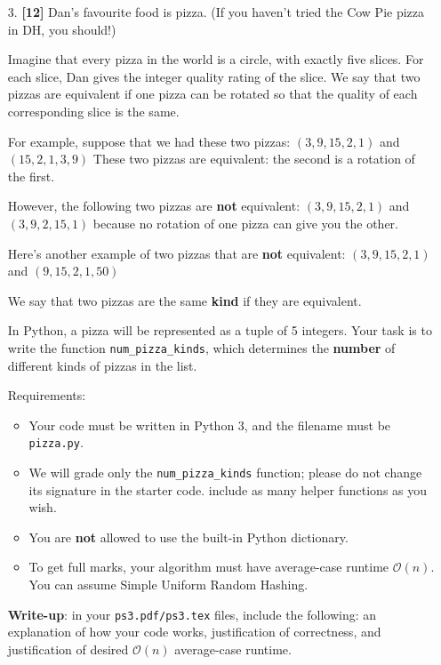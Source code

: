 \documentclass{assignment-263}
\begin{document}
\program

\begin{enumerate}
	\item[3.] \textbf{[12]} Dan's favourite food is pizza. (If you haven't
		tried the Cow Pie pizza in DH, you should!)

		Imagine that every pizza in the world is a circle, with exactly five slices.
		For each slice, Dan gives the integer quality rating of the slice. We say
		that two pizzas are equivalent if one pizza can be rotated so that the
		quality of each corresponding slice is the same.

		For example, suppose that we had these two pizzas:
		$(3, 9, 15, 2, 1)$
		and
		$(15, 2, 1, 3, 9)$
		These two pizzas are equivalent: the second is a rotation of the first.

		However, the following two pizzas are {\bf not} equivalent:
		$(3, 9, 15, 2, 1)$
		and
		$(3, 9, 2, 15, 1)$
		because no rotation of one pizza can give you the other.

		Here's another example of two pizzas that are {\bf not} equivalent:
		$(3, 9, 15, 2, 1)$
		and
		$(9, 15, 2, 1, 50)$

		We say that two pizzas are the same {\bf kind} if they are equivalent.

		In Python, a pizza will be represented as a tuple of 5 integers.
		Your task is to write the function \verb|num_pizza_kinds|, which
		determines the \textbf{number} of different kinds of pizzas in the
		list.


Requirements:
\begin{itemize}
\item Your code must be written in Python 3, and the filename must be \verb|pizza.py|.
\item We will grade only the \verb|num_pizza_kinds| function; please do not change its signature in the starter code. include as many helper functions as you wish.
   \item You are {\bf not} allowed to use the built-in Python
			dictionary.
			\item To get full marks, your algorithm must have average-case runtime
				$\mathcal{O}(n)$. You can assume Simple Uniform Random Hashing.
   \end{itemize}

\textbf{Write-up}: in your \verb|ps3.pdf/ps3.tex| files, include the following: an explanation of how your code works, justification of correctness, and
 justification of desired $\mathcal{O}(n)$ average-case runtime.


\end{enumerate}
\end{document}
